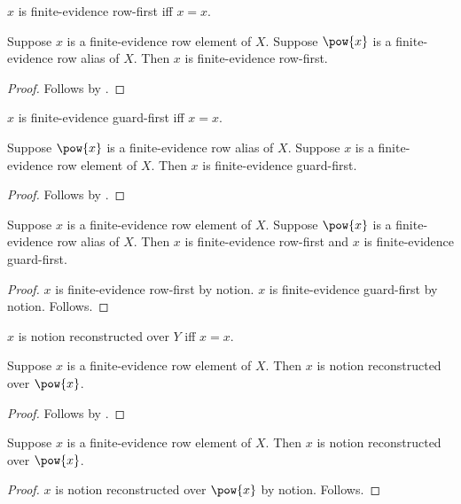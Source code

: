 \begin{definition}\label{notion_finite_evidence_row_first}
    $x$ is finite-evidence row-first iff $x=x$.
\end{definition}

\begin{classification}\label{notion_finite_evidence_row_first_intro}
    Suppose $x$ is a finite-evidence row element of $X$.
    Suppose $\pow{x}$ is a finite-evidence row alias of $X$.
    Then $x$ is finite-evidence row-first.
\end{classification}
\begin{proof}
    Follows by .
\end{proof}

\begin{definition}\label{notion_finite_evidence_guard_first}
    $x$ is finite-evidence guard-first iff $x=x$.
\end{definition}

\begin{classification}\label{notion_finite_evidence_guard_first_intro}
    Suppose $\pow{x}$ is a finite-evidence row alias of $X$.
    Suppose $x$ is a finite-evidence row element of $X$.
    Then $x$ is finite-evidence guard-first.
\end{classification}
\begin{proof}
    Follows by .
\end{proof}

\begin{proposition}\label{notion_finite_evidence_reconstructed_guard_client}
    Suppose $x$ is a finite-evidence row element of $X$.
    Suppose $\pow{x}$ is a finite-evidence row alias of $X$.
    Then $x$ is finite-evidence row-first and $x$ is finite-evidence guard-first.
\end{proposition}
\begin{proof}
    $x$ is finite-evidence row-first by notion.
    $x$ is finite-evidence guard-first by notion.
    Follows.
\end{proof}

\begin{definition}\label{notion_reconstructed_result}
    $x$ is notion reconstructed over $Y$ iff $x=x$.
\end{definition}

\begin{classification}\label{notion_reconstructed_result_intro}
    Suppose $x$ is a finite-evidence row element of $X$.
    Then $x$ is notion reconstructed over $\pow{x}$.
\end{classification}
\begin{proof}
    Follows by .
\end{proof}

\begin{proposition}\label{notion_reconstructed_result_client}
    Suppose $x$ is a finite-evidence row element of $X$.
    Then $x$ is notion reconstructed over $\pow{x}$.
\end{proposition}
\begin{proof}
    $x$ is notion reconstructed over $\pow{x}$ by notion.
    Follows.
\end{proof}
